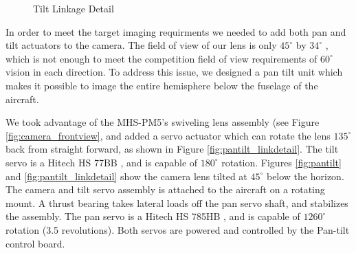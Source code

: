 \documentclass[pdftex,10pt,letter]{article}
\newcommand{\degrees}[1]
{
\begin{math}
#1^{\circ} 
\end{math}
}
\begin{document}
\begin{figure}
	\caption{Tilt Linkage Detail}
	\label{fig:pantilt_link}
\end{figure}

In order to meet the target imaging requirments we needed to add both pan and tilt actuators to the camera. The field of view of our lens is only \degrees{45} by \degrees{34}, which is not enough to meet the competition field of view requirements of \degrees{60} vision in each direction.  To address this issue, we designed a pan tilt unit which makes it possible to image the entire hemisphere below the fuselage of the aircraft.

We took advantage of the MHS-PM5's swiveling lens assembly (see Figure \ref{fig:camera_frontview}, and added a servo actuator which can rotate the lens \degrees{135} back from straight forward, as shown in Figure \ref{fig:pantilt_linkdetail}. The tilt servo is a Hitech HS 77BB \cite{hitechs77bb}, and is capable of \degrees{180} rotation. Figures \ref{fig:pantilt} and \ref{fig:pantilt_linkdetail} show the camera lens tilted at \degrees{45} below the horizon.
The camera and tilt servo assembly is attached to the aircraft on a rotating mount. A thrust bearing takes lateral loads off the pan servo shaft, and stabilizes the assembly. The pan servo is a Hitech HS 785HB \cite{hitechs785}, and is capable of \degrees{1260} rotation (3.5 revolutions). Both servos are powered and controlled by the Pan-tilt control board.
\end{document}
